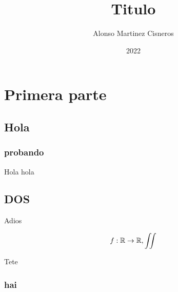 \documentclass[colorful]{sty/itam-thesis}
\author{Alonso Martinez Cisneros}
\title{Titulo}
\date{2022}
\begin{document}
\frontmatter
\maketitle
\makefrontmatter
{}

\mainmatter

\part{Primera parte}
\chapter{Hola}

\lipsum[1-10]

\section{probando}
Hola hola

\chapter{DOS}

Adios

\begin{equation}
	f: \mathbb{R} \to \mathbb{R}, \iint
\end{equation}

Tete

\section{hai}


\lipsum[1-2]

\nocite{*}
\printbibliography
\end{document}
